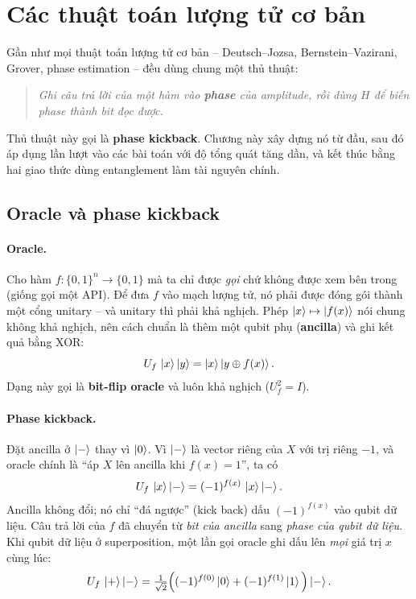 \section{Các thuật toán lượng tử cơ bản}
\label{sec:algorithms}

Gần như mọi thuật toán lượng tử cơ bản -- Deutsch--Jozsa, Bernstein--Vazirani, Grover, phase
estimation -- đều dùng chung một thủ thuật:
\begin{quote}
  \emph{Ghi câu trả lời của một hàm vào \textbf{phase} của amplitude, rồi dùng $H$ để biến phase thành
  bit đọc được.}
\end{quote}
Thủ thuật này gọi là \textbf{phase kickback}. Chương này xây dựng nó từ đầu, sau đó áp dụng lần lượt
vào các bài toán với độ tổng quát tăng dần, và kết thúc bằng hai giao thức dùng entanglement làm tài
nguyên chính.

\subsection{Oracle và phase kickback}

\paragraph{Oracle.} Cho hàm $f:\{0,1\}^n\to\{0,1\}$ mà ta chỉ được \emph{gọi} chứ không được xem bên
trong (giống gọi một API). Để đưa $f$ vào mạch lượng tử, nó phải được đóng gói thành một cổng unitary
-- và unitary thì phải khả nghịch. Phép $\ket{x}\mapsto\ket{f(x)}$ nói chung không khả nghịch, nên
cách chuẩn là thêm một qubit phụ (\textbf{ancilla}) và ghi kết quả bằng XOR:
\begin{equation}
  U_f\,\ket{x}\ket{y} = \ket{x}\ket{y\oplus f(x)}.
  \label{eq:oracle}
\end{equation}
Dạng này gọi là \textbf{bit-flip oracle} và luôn khả nghịch ($U_f^2 = I$).

\paragraph{Phase kickback.} Đặt ancilla ở $\ket{-}$ thay vì $\ket{0}$. Vì $\ket{-}$ là vector riêng
của $X$ với trị riêng $-1$, và oracle chính là ``áp $X$ lên ancilla khi $f(x)=1$'', ta có
\begin{equation}
  U_f\,\ket{x}\ket{-} = (-1)^{f(x)}\,\ket{x}\ket{-}.
  \label{eq:kickback}
\end{equation}
Ancilla không đổi; nó chỉ ``đá ngược'' (kick back) dấu $(-1)^{f(x)}$ vào qubit dữ liệu. Câu trả lời
của $f$ đã chuyển từ \emph{bit của ancilla} sang \emph{phase của qubit dữ liệu}. Khi qubit dữ liệu ở
superposition, một lần gọi oracle ghi dấu lên \emph{mọi} giá trị $x$ cùng lúc:
\begin{equation}
  U_f\,\ket{+}\ket{-} = \tfrac{1}{\sqrt2}\Big((-1)^{f(0)}\ket{0} + (-1)^{f(1)}\ket{1}\Big)\ket{-}.
\end{equation}

